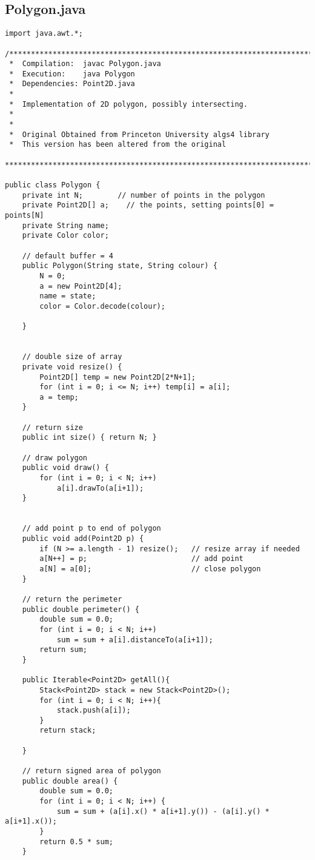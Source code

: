 \subsection{Polygon.java}
\begin{verbatim}
import java.awt.*;

/*************************************************************************
 *  Compilation:  javac Polygon.java
 *  Execution:    java Polygon
 *  Dependencies: Point2D.java
 *
 *  Implementation of 2D polygon, possibly intersecting.
 *
 *
 *  Original Obtained from Princeton University algs4 library
 *  This version has been altered from the original
 *************************************************************************/

public class Polygon {
    private int N;        // number of points in the polygon
    private Point2D[] a;    // the points, setting points[0] = points[N]
    private String name;
    private Color color;

    // default buffer = 4
    public Polygon(String state, String colour) {
        N = 0;
        a = new Point2D[4];
        name = state;
        color = Color.decode(colour);

    }


    // double size of array
    private void resize() {
        Point2D[] temp = new Point2D[2*N+1];
        for (int i = 0; i <= N; i++) temp[i] = a[i];
        a = temp;
    }

    // return size
    public int size() { return N; }

    // draw polygon
    public void draw() {
        for (int i = 0; i < N; i++)
            a[i].drawTo(a[i+1]);
    }


    // add point p to end of polygon
    public void add(Point2D p) {
        if (N >= a.length - 1) resize();   // resize array if needed
        a[N++] = p;                        // add point
        a[N] = a[0];                       // close polygon
    }

    // return the perimeter
    public double perimeter() {
        double sum = 0.0;
        for (int i = 0; i < N; i++)
            sum = sum + a[i].distanceTo(a[i+1]);
        return sum;
    }

    public Iterable<Point2D> getAll(){
        Stack<Point2D> stack = new Stack<Point2D>();
        for (int i = 0; i < N; i++){
            stack.push(a[i]);
        }
        return stack;

    }

    // return signed area of polygon
    public double area() {
        double sum = 0.0;
        for (int i = 0; i < N; i++) {
            sum = sum + (a[i].x() * a[i+1].y()) - (a[i].y() * a[i+1].x());
        }
        return 0.5 * sum;
    }


\end{verbatim}
